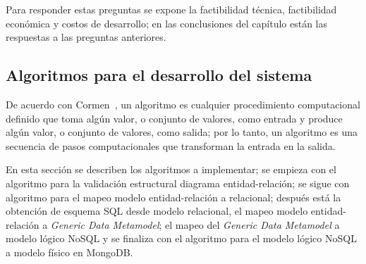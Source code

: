 Para responder estas preguntas se expone la factibilidad técnica, factibilidad económica y costos de desarrollo; en las conclusiones del capítulo están las respuestas a las preguntas anteriores.




%

\subsection{Algoritmos para el desarrollo del sistema}\label{sec:analisis-algoritmos}

De acuerdo con Cormen~\cite{cormen_introduction_2009}, un algoritmo es cualquier procedimiento computacional definido que toma algún valor, o conjunto de valores, como entrada y produce algún valor, o conjunto de valores, como salida; por lo tanto, un algoritmo es una secuencia de pasos computacionales que transforman la entrada en la salida.


En esta sección se describen los algoritmos a implementar; se empieza con el algoritmo para la validación estructural diagrama entidad-relación; se sigue con algoritmo para el mapeo modelo entidad-relación a relacional; después está la obtención de esquema SQL desde modelo relacional, el mapeo modelo entidad-relación a \textit{Generic Data Metamodel}; el mapeo del \textit{Generic Data Metamodel} a modelo lógico NoSQL y se finaliza con el algoritmo para el modelo lógico NoSQL a modelo físico en MongoDB.




